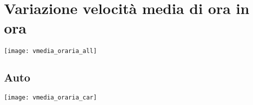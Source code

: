 \section{Variazione velocità media di ora in ora}

\begin{center}
	\texttt{[image: vmedia\_oraria\_all]}
\end{center}

\subsection{Auto}

\begin{center}
	\texttt{[image: vmedia\_oraria\_car]}
\end{center}



